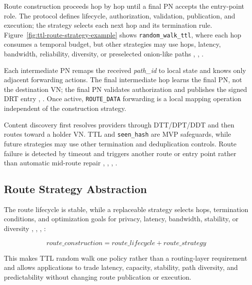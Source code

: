 \documentclass[
  12pt,
  oneside,
  a4paper,
  chapter=TITLE,
  section=TITLE,
  english,
  brazil
]{abntex2}
\begin{document}
\thesisroutestrategyconstructiontikz

\thesishopbyhoptikz

Route construction proceeds hop by hop until a final PN accepts the entry-point role. The protocol defines lifecycle, authorization, validation, publication, and execution; the strategy selects each next hop and its termination rule. Figure~\ref{fig:ttl-route-strategy-example} shows \texttt{random\_walk\_ttl}, where each hop consumes a temporal budget, but other strategies may use hops, latency, bandwidth, reliability, diversity, or preselected onion-like paths \cite{tosic2022spatial}, \cite{mirzaei2018pk}, \cite{qian2016garlic}.

Each intermediate PN remaps the received \textit{path\_id} to local state and knows only adjacent forwarding actions. The final intermediate hop learns the final PN, not the destination VN; the final PN validates authorization and publishes the signed DRT entry \cite{mirzaei2018pk}, \cite{qian2016garlic}. Once active, \texttt{ROUTE\_DATA} forwarding is a local mapping operation independent of the construction strategy.

Content discovery first resolves providers through DTT/DPT/DDT and then routes toward a holder VN. TTL and \texttt{seen\_hash} are MVP safeguards, while future strategies may use other termination and deduplication controls. Route failure is detected by timeout and triggers another route or entry point rather than automatic mid-route repair \cite{li2022unreachable}, \cite{mehr2019unstructured}, \cite{augustine2022byzantine}, \cite{qian2016garlic}.

\subsection{Route Strategy Abstraction}
\label{subsubsec:route-strategy-abstraction}

The route lifecycle is stable, while a replaceable strategy selects hops, termination conditions, and optimization goals for privacy, latency, bandwidth, stability, or diversity \cite{tosic2022spatial}, \cite{augustine2022byzantine}, \cite{mirzaei2018pk}, \cite{qian2016garlic}:

\[
route\_construction = route\_lifecycle + route\_strategy
\]

This makes TTL random walk one policy rather than a routing-layer requirement and allows applications to trade latency, capacity, stability, path diversity, and predictability without changing route publication or execution.
\end{document}
